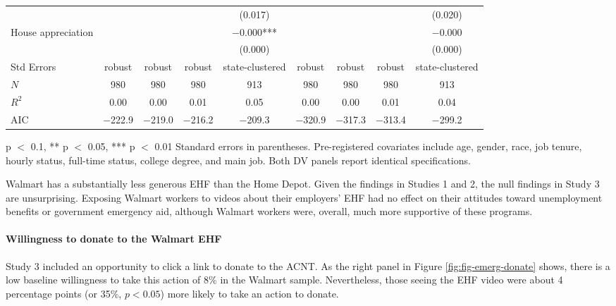 \documentclass[
  11pt,
  oneside]{article}
\begin{document}
\begin{table}[!h]
{\begin{threeparttable}
\begin{tabular}[t]{lccc>{}c|cccc}
 &  &  &  & (\num{0.017}) &  &  &  & (\num{0.020})\\
House appreciation &  &  &  & \num{-0.000}*** &  &  &  & \num{-0.000}\\
 &  &  &  & (\num{0.000}) &  &  &  & (\num{0.000})\\
\midrule
Std Errors & robust & robust & robust & state-clustered & robust & robust & robust & state-clustered\\
$N$ & \num{980} & \num{980} & \num{980} & \num{913} & \num{980} & \num{980} & \num{980} & \num{913}\\
$R^2$ & \num{0.00} & \num{0.00} & \num{0.01} & \num{0.05} & \num{0.00} & \num{0.00} & \num{0.01} & \num{0.04}\\
AIC & \num{-222.9} & \num{-219.0} & \num{-216.2} & \num{-209.3} & \num{-320.9} & \num{-317.3} & \num{-313.4} & \num{-299.2}\\
\bottomrule
\end{tabular}
\begin{tablenotes}
\footnotesize
\item * p $<$ 0.1, ** p $<$ 0.05, *** p $<$ 0.01 Standard errors in parentheses. Pre-registered covariates include age, gender, race, job tenure, hourly status, full-time status, college degree, and main job. Both DV panels report identical specifications.
\end{tablenotes}
\end{threeparttable}}
\end{table}

Walmart has a substantially less generous EHF than the Home Depot. Given the findings in Studies 1 and 2, the null findings in Study 3 are unsurprising. Exposing Walmart workers to videos about their employers' EHF had no effect on their attitudes toward unemployment benefits or government emergency aid, although Walmart workers were, overall, much more supportive of these programs.

\paragraph{Willingness to donate to the Walmart EHF}\label{willingness-to-donate-to-the-walmart-ehf}

Study 3 included an opportunity to click a link to donate to the ACNT. As the right panel in Figure \ref{fig:fig-emerg-donate} shows, there is a low baseline willingness to take this action of 8\% in the Walmart sample. Nevertheless, those seeing the EHF video were about 4 percentage points (or 35\%, \(p < 0.05\)) more likely to take an action to donate.
\end{document}
